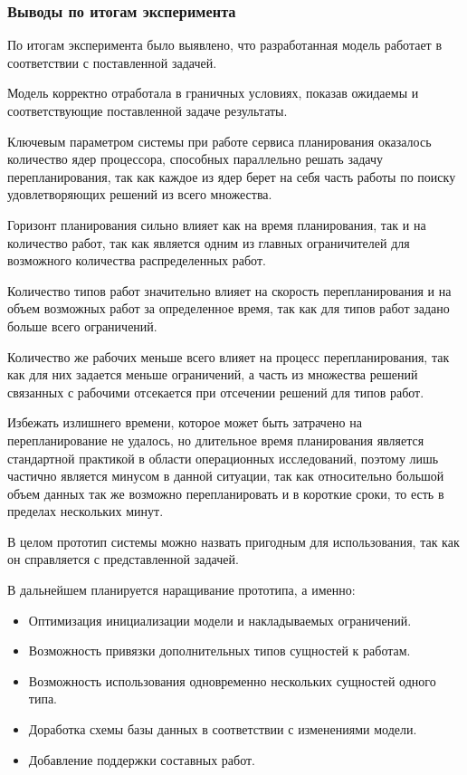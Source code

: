 \subsubsection{Выводы по итогам эксперимента}
По итогам эксперимента было выявлено, что разработанная модель работает в соответствии с поставленной задачей.

Модель корректно отработала в граничных условиях, показав ожидаемы и соответствующие поставленной задаче результаты.

Ключевым параметром системы при работе сервиса планирования оказалось количество ядер процессора, способных параллельно решать задачу перепланирования, так как каждое из ядер берет на себя часть работы по поиску удовлетворяющих решений из всего множества.

Горизонт планирования сильно влияет как на время планирования, так и на количество работ, так как является одним из главных ограничителей для возможного количества распределенных работ.

Количество типов работ значительно влияет на скорость перепланирования и на объем возможных работ за определенное время, так как для типов работ задано больше всего ограничений.

Количество же рабочих меньше всего влияет на процесс перепланирования, так как для них задается меньше ограничений, а часть из множества решений связанных с рабочими отсекается при отсечении решений для типов работ.

Избежать излишнего времени, которое может быть затрачено на перепланирование не удалось, но длительное время планирования является стандартной практикой в области операционных исследований, поэтому лишь частично является минусом в данной ситуации, так как относительно большой объем данных так же возможно перепланировать и в короткие сроки, то  есть в пределах нескольких минут.

В целом прототип системы можно назвать пригодным для использования, так как он справляется с представленной задачей.

В дальнейшем планируется наращивание прототипа, а именно:

\begin{itemize}
    \item Оптимизация инициализации модели и накладываемых ограничений.
    \item Возможность привязки дополнительных типов сущностей к работам.
    \item Возможность использования одновременно нескольких сущностей одного типа.
    \item Доработка схемы базы данных в соответствии с изменениями модели.
    \item Добавление поддержки составных работ.
\end{itemize}
\clearpage
